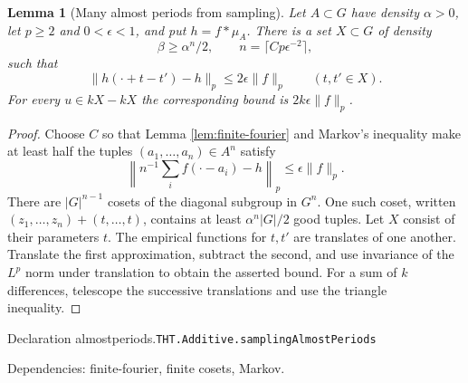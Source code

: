 \documentclass[11pt]{article}
\newtheorem{lemma}[theorem]{Lemma}
\theoremstyle{definition}
\numberwithin{equation}{section}
\newcommand{\bp}[3]{\par\smallskip\begingroup\footnotesize
\noindent\hypertarget{bp:#1}{\textsf{Declaration #1.}}\quad\nolinkurl{#2}\par
\noindent\textsf{Dependencies:} #3.\par\endgroup\smallskip}
\begin{document}
\begin{lemma}[Many almost periods from sampling]\label{lem:almostperiods}
Let $A\subset G$ have density $\alpha>0$, let $p\ge2$ and $0<\epsilon<1$, and put $h=f*\mu_A$. There is a set $X\subset G$ of density
\[
 \beta\ge\alpha^n/2,\qquad n=\lceil C p\epsilon^{-2}\rceil,
\]
such that
\[
 \|h(\cdot+t-t')-h\|_p\le2\epsilon\|f\|_p\qquad(t,t'\in X).
\]
For every $u\in kX-kX$ the corresponding bound is $2k\epsilon\|f\|_p$.
\end{lemma}
\begin{proof}
Choose $C$ so that Lemma \ref{lem:finite-fourier} and Markov's inequality make at least half the tuples $(a_1,\ldots,a_n)\in A^n$ satisfy
\[
 \left\|n^{-1}\sum_i f(\cdot-a_i)-h\right\|_p\le\epsilon\|f\|_p.
\]
There are $|G|^{n-1}$ cosets of the diagonal subgroup in $G^n$. One such coset, written $(z_1,\ldots,z_n)+(t,\ldots,t)$, contains at least $\alpha^n|G|/2$ good tuples. Let $X$ consist of their parameters $t$. The empirical functions for $t,t'$ are translates of one another. Translate the first approximation, subtract the second, and use invariance of the $L^p$ norm under translation to obtain the asserted bound. For a sum of $k$ differences, telescope the successive translations and use the triangle inequality.
\end{proof}
\bp{almostperiods}{THT.Additive.samplingAlmostPeriods}{finite-fourier, finite cosets, Markov}
\end{document}
